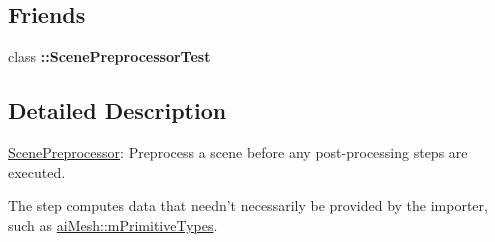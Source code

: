 \subsection*{Friends}
\begin{DoxyCompactItemize}
\item 
\hypertarget{class_assimp_1_1_scene_preprocessor_a9ac62147ad215dd45ec3f58b1083b34b}{class {\bfseries \+::\+Scene\+Preprocessor\+Test}}\label{class_assimp_1_1_scene_preprocessor_a9ac62147ad215dd45ec3f58b1083b34b}

\end{DoxyCompactItemize}


\subsection{Detailed Description}
\hyperlink{class_assimp_1_1_scene_preprocessor}{Scene\+Preprocessor}\+: Preprocess a scene before any post-\/processing steps are executed.

The step computes data that needn't necessarily be provided by the importer, such as \hyperlink{structai_mesh_a99d66ac0a444068c1b252b30265cbf53}{ai\+Mesh\+::m\+Primitive\+Types}. 

